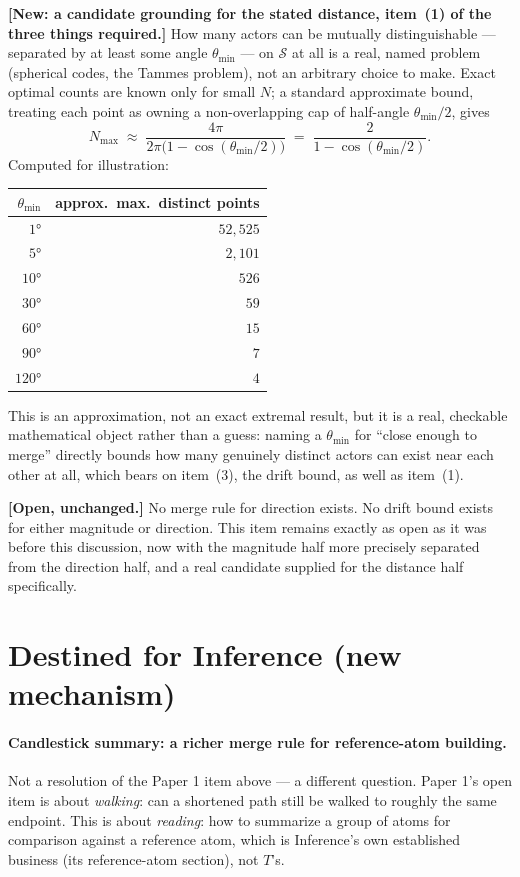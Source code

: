 \documentclass[11pt]{article}
\begin{document}
\textbf{[New: a candidate grounding for the stated distance,
item~(1) of the three things required.]} How many actors can be
mutually distinguishable --- separated by at least some angle
$\theta_{\min}$ --- on $\mathcal{S}$ at all is a real, named problem
(spherical codes, the Tammes problem), not an arbitrary choice to
make. Exact optimal counts are known only for small $N$; a standard
approximate bound, treating each point as owning a non-overlapping
cap of half-angle $\theta_{\min}/2$, gives
\[
N_{\max} \;\approx\; \frac{4\pi}{2\pi\bigl(1-\cos(\theta_{\min}/2)\bigr)}
\;=\; \frac{2}{1-\cos(\theta_{\min}/2)}.
\]
Computed for illustration:
\begin{center}
\begin{tabular}{rr}
$\theta_{\min}$ & approx.\ max.\ distinct points \\
\hline
$1°$   & $52{,}525$ \\
$5°$   & $2{,}101$ \\
$10°$  & $526$ \\
$30°$  & $59$ \\
$60°$  & $15$ \\
$90°$  & $7$ \\
$120°$ & $4$ \\
\end{tabular}
\end{center}
This is an approximation, not an exact extremal result, but it is a
real, checkable mathematical object rather than a guess: naming a
$\theta_{\min}$ for ``close enough to merge'' directly bounds how many
genuinely distinct actors can exist near each other at all, which
bears on item~(3), the drift bound, as well as item~(1).

\textbf{[Open, unchanged.]} No merge rule for direction exists. No
drift bound exists for either magnitude or direction. This item
remains exactly as open as it was before this discussion, now with
the magnitude half more precisely separated from the direction half,
and a real candidate supplied for the distance half specifically.

\section{Destined for Inference (new mechanism)}

\paragraph{Candlestick summary: a richer merge rule for reference-atom
building.} Not a resolution of the Paper 1 item above --- a different
question. Paper 1's open item is about \emph{walking}: can a shortened
path still be walked to roughly the same endpoint. This is about
\emph{reading}: how to summarize a group of atoms for comparison
against a reference atom, which is Inference's own established
business (its reference-atom section), not $T$'s.
\end{document}
